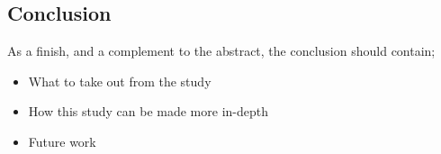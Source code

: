 \documentclass[runningheads,a4paper,oribibl]{llncs}
\begin{document}
\subsection{Conclusion}
As a finish, and a complement to the abstract, the conclusion should contain;
\begin{itemize}
	\item What to take out from the study
	\item How this study can be made more in-depth
	\item Future work

\end{itemize}





\nocite{*}
% 



\end{document}
